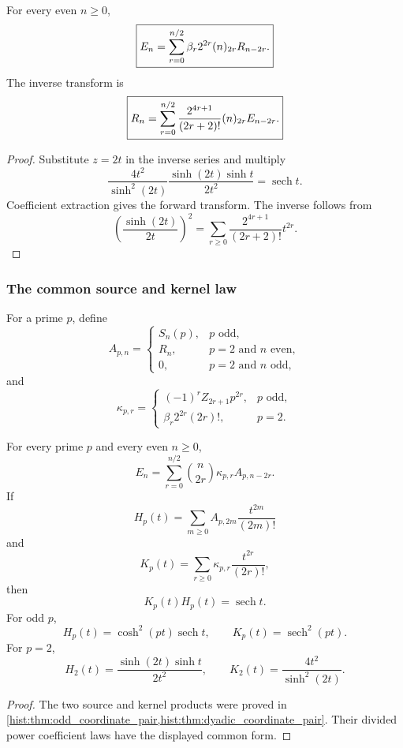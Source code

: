 \begin{histtheorem}\label{hist:thm:dyadic_coordinate_pair}
For every even \(n\geq0\),
\[
\boxed{
E_n
=
\sum_{r=0}^{n/2}
\beta_r2^{2r}
(n)_{2r}
R_{n-2r}.
}
\]
The inverse transform is
\[
\boxed{
R_n
=
\sum_{r=0}^{n/2}
\frac{2^{4r+1}}{(2r+2)!}
(n)_{2r}
E_{n-2r}.
}
\]
\end{histtheorem}

\begin{proof}
Substitute \(z=2t\) in the inverse series and multiply
\[
\frac{4t^2}{\sinh^2(2t)}
\frac{\sinh(2t)\sinh t}{2t^2}
=
\operatorname{sech}t.
\]
Coefficient extraction gives the forward transform. The inverse follows from
\[
\left(\frac{\sinh(2t)}{2t}\right)^2
=
\sum_{r\geq0}
\frac{2^{4r+1}}{(2r+2)!}t^{2r}.
\]
\end{proof}

\subsubsection{The common source and kernel law}

For a prime \(p\), define
\[
A_{p,n}
=
\begin{cases}
S_n(p),&p\text{ odd},\\
R_n,&p=2\text{ and }n\text{ even},\\
0,&p=2\text{ and }n\text{ odd},
\end{cases}
\]
and
\[
\kappa_{p,r}
=
\begin{cases}
(-1)^rZ_{2r+1}p^{2r},&p\text{ odd},\\
\beta_r2^{2r}(2r)!,&p=2.
\end{cases}
\]

\begin{histtheorem}\label{hist:thm:unified_local_euler}
For every prime \(p\) and every even \(n\geq0\),
\[
\boxed{
E_n
=
\sum_{r=0}^{n/2}
\binom n{2r}
\kappa_{p,r}
A_{p,n-2r}.
}
\]
If
\[
H_p(t)
=
\sum_{m\geq0}A_{p,2m}\frac{t^{2m}}{(2m)!}
\]
and
\[
K_p(t)
=
\sum_{r\geq0}\kappa_{p,r}\frac{t^{2r}}{(2r)!},
\]
then
\[
\boxed{K_p(t)H_p(t)=\operatorname{sech}t.}
\]
For odd \(p\),
\[
H_p(t)=\cosh^2(pt)\operatorname{sech}t,
\qquad
K_p(t)=\operatorname{sech}^2(pt).
\]
For \(p=2\),
\[
H_2(t)=\frac{\sinh(2t)\sinh t}{2t^2},
\qquad
K_2(t)=\frac{4t^2}{\sinh^2(2t)}.
\]
\end{histtheorem}

\begin{proof}
The two source and kernel products were proved in \cref{hist:thm:odd_coordinate_pair,hist:thm:dyadic_coordinate_pair}. Their divided power coefficient laws have the displayed common form.
\end{proof}

